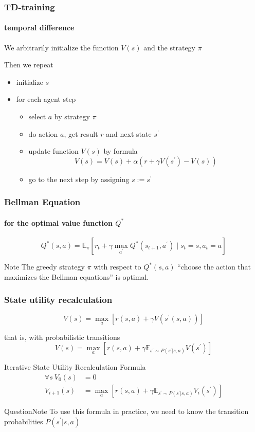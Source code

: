 \documentclass[fullscreen=true, bookmarks=true, hyperref={pdfencoding=unicode}]{beamer}
\begin{document}
\begin{frame}
  \frametitle{TD-training}
    \framesubtitle{temporal difference}

    We arbitrarily initialize the function $V(s)$ and the strategy $\pi$

    Then we repeat
    \begin{itemize}
      \item initialize $s$
      \item for each agent step
        \begin{itemize}
          \item select $a$ by strategy $\pi$
          \item do action $a$, get result $r$ and next state $s^\prime$
          \item update function $V(s)$ by formula
          $$ V(s) = V(s) + \alpha \left(r + \gamma V(s^\prime) - V(s) \right)$$
          \item go to the next step by assigning $s := s^\prime$
        \end{itemize}
    \end{itemize}
\end{frame}


\begin{frame}
  \frametitle{Bellman Equation}
    \framesubtitle{for the optimal value function $Q^*$}

    $$ Q^* (s,a) = \mathbb{E}_\pi \left[r_t + \gamma \max\limits_{a^\prime} Q^* (s_{t+1},a^\prime) \mid s_t = s, a_t = a \right]$$

    \vspace{1cm}
    \begin{block}{Note}
      The greedy strategy $\pi$ with respect to $Q^*(s,a)$ ``choose the action that maximizes the Bellman equations'' is optimal.
    \end{block}
\end{frame}


\begin{frame}
  \frametitle{State utility recalculation}

    $$V(s) = \max\limits_a [r(s, a) + \gamma V(s^\prime (s, a))]$$

    \vspace{0.5cm}
    that is, with probabilistic transitions
    $$V(s) = \max\limits_a [r(s, a) + \gamma \mathbb{E}_{s^\prime \sim P(s^\prime | s, a)} V(s^ \prime)]$$

    \vspace{0.5cm}
    Iterative State Utility Recalculation Formula
    \begin{align*}
      \forall s \ V_0(s) &= 0 \\
      V_{i+1}(s) &= \max\limits_a [r(s, a) + \gamma \mathbb{E}_{s^\prime \sim P(s^\prime | s, a)} V_{i}(s^\prime)]
    \end{align*}
    \pause
    \begin{block}{Question}{Note}
      To use this formula in practice,
      we need to know the transition probabilities $P(s^\prime| s, a)$
    \end{block}
\end{frame}
\end{document}
